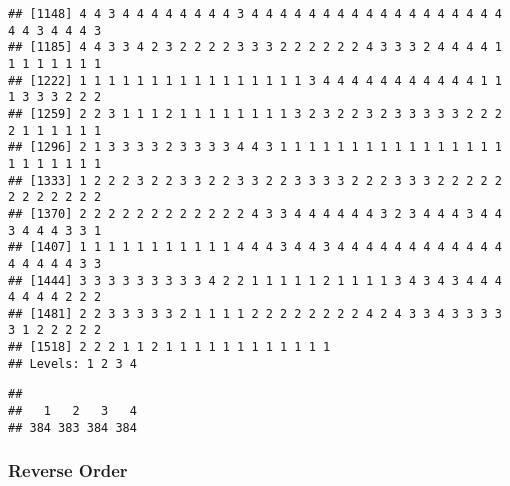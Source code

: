 \documentclass[
]{article}
\begin{document}
\begin{verbatim}
## [1148] 4 4 3 4 4 4 4 4 4 4 4 3 4 4 4 4 4 4 4 4 4 4 4 4 4 4 4 4 4 4 4 4 3 4 4 4 3
## [1185] 4 4 3 3 4 2 3 2 2 2 2 3 3 3 2 2 2 2 2 2 4 3 3 3 2 4 4 4 4 1 1 1 1 1 1 1 1
## [1222] 1 1 1 1 1 1 1 1 1 1 1 1 1 1 1 1 3 4 4 4 4 4 4 4 4 4 4 4 1 1 1 3 3 3 2 2 2
## [1259] 2 2 3 1 1 1 2 1 1 1 1 1 1 1 1 3 2 3 2 2 3 2 3 3 3 3 3 2 2 2 2 1 1 1 1 1 1
## [1296] 2 1 3 3 3 3 2 3 3 3 3 4 4 3 1 1 1 1 1 1 1 1 1 1 1 1 1 1 1 1 1 1 1 1 1 1 1
## [1333] 1 2 2 2 3 2 2 3 3 2 2 3 3 2 2 3 3 3 3 2 2 2 3 3 3 2 2 2 2 2 2 2 2 2 2 2 2
## [1370] 2 2 2 2 2 2 2 2 2 2 2 2 4 3 3 4 4 4 4 4 4 3 2 3 4 4 4 3 4 4 3 4 4 4 3 3 1
## [1407] 1 1 1 1 1 1 1 1 1 1 1 4 4 4 3 4 4 3 4 4 4 4 4 4 4 4 4 4 4 4 4 4 4 4 4 3 3
## [1444] 3 3 3 3 3 3 3 3 3 4 2 2 1 1 1 1 1 2 1 1 1 1 3 4 3 4 3 4 4 4 4 4 4 4 2 2 2
## [1481] 2 2 3 3 3 3 3 2 1 1 1 1 2 2 2 2 2 2 2 2 4 2 4 3 3 4 3 3 3 3 3 1 2 2 2 2 2
## [1518] 2 2 2 1 1 2 1 1 1 1 1 1 1 1 1 1 1 1
## Levels: 1 2 3 4
\end{verbatim}

\begin{verbatim}
## 
##   1   2   3   4 
## 384 383 384 384
\end{verbatim}

\hypertarget{reverse-order}{%
\subsubsection{Reverse Order}\label{reverse-order}}
\end{document}
